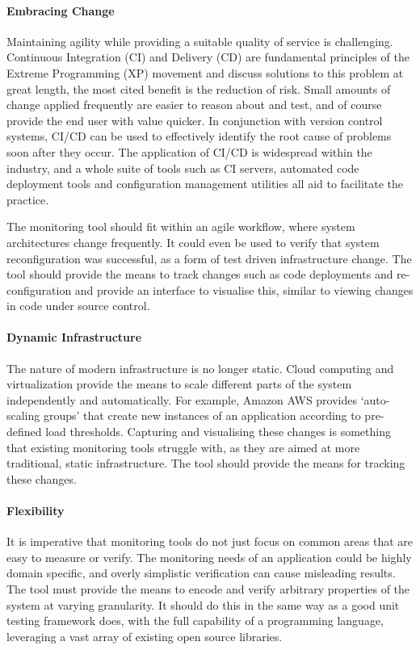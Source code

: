 \documentclass{cshonours}
\begin{document}
\paragraph{Embracing Change}

Maintaining agility while providing a suitable quality of service is challenging. Continuous Integration (CI) and Delivery (CD) are fundamental principles of the Extreme Programming (XP) movement and discuss solutions to this problem at great length, the most cited benefit is the reduction of risk. Small amounts of change applied frequently are easier to reason about and test, and of course provide the end user with value quicker. In conjunction with version control systems, CI/CD can be used to effectively identify the root cause of problems soon after they occur. The application of CI/CD is widespread within the industry, and a whole suite of tools such as CI servers, automated code deployment tools and configuration management utilities all aid to facilitate the practice.

The monitoring tool should fit within an agile workflow, where system architectures change frequently. It could even be used to verify that system reconfiguration was successful, as a form of test driven infrastructure change. The tool should provide the means to track changes such as code deployments and re-configuration and provide an interface to visualise this, similar to viewing changes in code under source control.

\paragraph{Dynamic Infrastructure}

The nature of modern infrastructure is no longer static. Cloud computing and virtualization provide the means to scale different parts of the system independently and automatically. For example, Amazon AWS provides `auto-scaling groups' that create new instances of an application according to pre-defined load thresholds. Capturing and visualising these changes is something that existing monitoring tools struggle with, as they are aimed at more traditional, static infrastructure. The tool should provide the means for tracking these changes.

\paragraph{Flexibility}

It is imperative that monitoring tools do not just focus on common areas that are easy to measure or verify. The monitoring needs of an application could be highly domain specific, and overly simplistic verification can cause misleading results. The tool must provide the means to encode and verify arbitrary properties of the system at varying granularity. It should do this in the same way as a good unit testing framework does, with the full capability of a programming language, leveraging a vast array of existing open source libraries.
\end{document}
